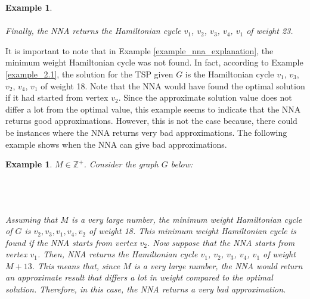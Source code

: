 \documentclass[12pt]{article}
\newtheorem{example}[definition]{Example}
\numberwithin{equation}{subsection}
\numberwithin{table}{subsection}
\begin{document}
\begin{example}
\\\\
Finally, the NNA returns the Hamiltonian cycle $v_1$, $v_2$, $v_3$, $v_4$, $v_1$ of weight 23.
\end{example}
It is important to note that in Example \ref{example_nna_explanation}, the minimum weight Hamiltonian cycle was not found. In fact, according to Example \ref{example_2.1}, the solution for the TSP given $G$ is the Hamiltonian cycle $v_1$, $v_3$, $v_2$, $v_4$, $v_1$ of weight 18. Note that the NNA would have found the optimal solution if it had started from vertex $v_2$. Since the approximate solution value does not differ a lot from the optimal value, this example seems to indicate that the NNA returns good approximations. However, this is not the case because, there could be instances where the NNA returns very bad approximations. The following example shows when the NNA can give bad approximations.
\begin{example}
\label{nna_fail}
 $M \in \mathbb{Z}^+$. Consider the graph $G$ below:
\\\\
\\\\
Assuming that $M$ is a very large number, the minimum weight Hamiltonian cycle of $G$ is $v_2, v_3, v_1, v_4, v_2$ of weight 18. This minimum weight Hamiltonian cycle is found if the NNA starts from vertex $v_2$. Now suppose that the NNA starts from vertex $v_1$. Then, NNA returns the Hamiltonian cycle $v_1$, $v_2$, $v_3$, $v_4$, $v_1$ of weight $M + 13$. This means that, since $M$ is a very large number, the NNA would return an approximate result that differs a lot in weight compared to the optimal solution. Therefore, in this case, the NNA returns a very bad approximation.
\end{example}
\end{document}
